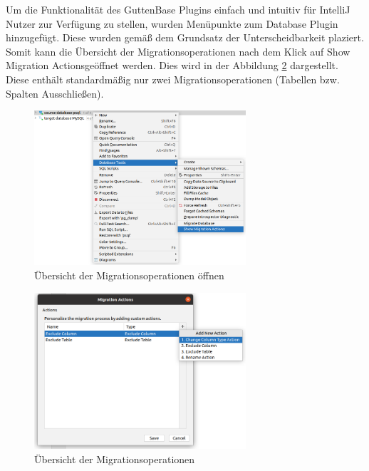 	Um die Funktionalität des GuttenBase Plugins einfach und intuitiv für IntelliJ Nutzer zur Verfügung zu stellen, wurden Menüpunkte zum Database Plugin hinzugefügt. Diese wurden gemäß dem Grundsatz der Unterscheidbarkeit plaziert. Somit kann die Übersicht der Migrationsoperationen nach dem Klick auf \glqq Show Migration Actions\grqq geöffnet werden. Dies wird in der Abbildung \ref{img:creategbaction} dargestellt. Diese enthält standardmäßig nur zwei Migrationsoperationen (Tabellen bzw. Spalten Ausschließen).\\ 
	\begin{figure}[h]
		\centering
		\includegraphics[width=0.7\textwidth]{images/ui/dbactions}
		\caption{Übersicht der Migrationsoperationen öffnen}
		\label{img:dbactions}
	\end{figure}
	\begin{figure}[H]
		\centering
		\includegraphics[width=0.7\textwidth]{images/ui/creategbaction}
		\caption{Übersicht der Migrationsoperationen}
		\label{img:creategbaction}
	\end{figure}

